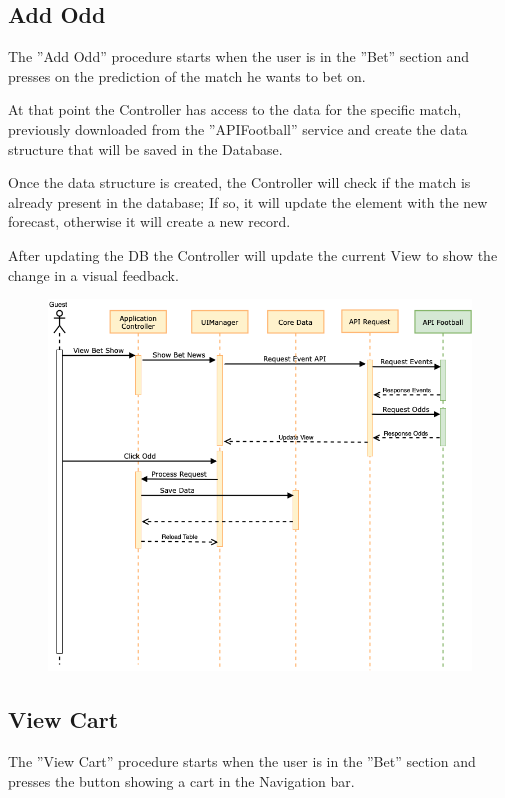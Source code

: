 \documentclass[numbers=noenddot, 12pt, a4paper, oneside]{scrbook}
\begin{document}
\newpage
\subsection*{Add Odd}
The ”Add Odd” procedure starts when the user is in the ”Bet” section and presses on  the prediction of the match he wants to bet on.

At that point the Controller has access to the data for the specific match, previously downloaded from the ”APIFootball” service and create the data structure that will be saved in the Database.

Once the data structure is created, the Controller will check if the match is already present in the database; If so, it will update the element with the new forecast, otherwise it will create a new record.

After updating the DB the Controller will update the current View to show the change in a visual feedback.

\begin{figure}[H]
	\centering
	\includegraphics[width=1\textwidth]{images/Sequence/SequenceAddOdd}
\end{figure}
\newpage
\subsection*{View Cart}
The ”View Cart” procedure starts when the user is in the ”Bet” section and presses the button showing a cart in the Navigation bar.
\end{document}
